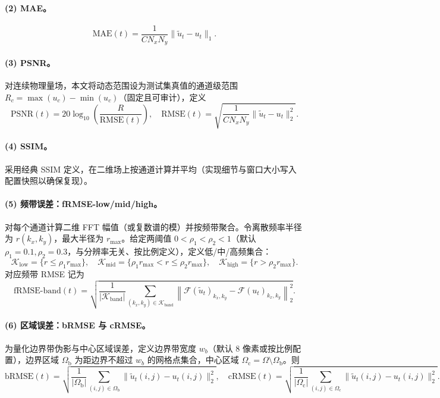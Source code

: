 \paragraph{(2) MAE。}
\begin{equation}
\mathrm{MAE}(t) = \frac{1}{C N_x N_y}\|\tilde u_t-u_t\|_1.
\label{eq:mae}
\end{equation}

\paragraph{(3) PSNR。}
对连续物理量场，本文将动态范围设为测试集真值的通道级范围 $R_c=\max(u_c)-\min(u_c)$（固定且可审计），定义
\begin{equation}
\mathrm{PSNR}(t)=20\log_{10}\left(\frac{R}{\mathrm{RMSE}(t)}\right),
\quad
\mathrm{RMSE}(t)=\sqrt{\frac{1}{C N_x N_y}\|\tilde u_t-u_t\|_2^2}.
\label{eq:psnr}
\end{equation}

\paragraph{(4) SSIM。}
采用经典 SSIM 定义\cite{wang2004ssim}，在二维场上按通道计算并平均（实现细节与窗口大小写入配置快照以确保复现）。

\paragraph{(5) 频带误差：fRMSE-low/mid/high。}
对每个通道计算二维 FFT 幅值（或复数谱的模）并按频带聚合。令离散频率半径为 $r(k_x,k_y)$，最大半径为 $r_{\max}$。给定两阈值 $0<\rho_1<\rho_2<1$（默认 $\rho_1=0.1,\rho_2=0.3$，与分辨率无关、按比例定义），定义低/中/高频集合：
\[
\mathcal{K}_{\text{low}}=\{r\le \rho_1 r_{\max}\},\quad
\mathcal{K}_{\text{mid}}=\{\rho_1 r_{\max}< r\le \rho_2 r_{\max}\},\quad
\mathcal{K}_{\text{high}}=\{r> \rho_2 r_{\max}\}.
\]
对应频带 RMSE 记为
\begin{equation}
\mathrm{fRMSE\mbox{-}band}(t)=
\sqrt{
\frac{1}{|\mathcal{K}_{\text{band}}|}
\sum_{(k_x,k_y)\in\mathcal{K}_{\text{band}}}
\left\|
\mathcal{F}(\tilde u_t)_{k_x,k_y}-\mathcal{F}(u_t)_{k_x,k_y}
\right\|_2^2
}.
\label{eq:frmse}
\end{equation}

\paragraph{(6) 区域误差：bRMSE 与 cRMSE。}
为量化边界带伪影与中心区域误差，定义边界带宽度 $w_b$（默认 8 像素或按比例配置），边界区域 $\Omega_{\text{b}}$ 为距边界不超过 $w_b$ 的网格点集合，中心区域 $\Omega_{\text{c}}=\Omega\setminus\Omega_{\text{b}}$。则
\begin{equation}
\mathrm{bRMSE}(t)=\sqrt{\frac{1}{|\Omega_{\text{b}}|}\sum_{(i,j)\in\Omega_{\text{b}}}\|\tilde u_t(i,j)-u_t(i,j)\|_2^2},
\quad
\mathrm{cRMSE}(t)=\sqrt{\frac{1}{|\Omega_{\text{c}}|}\sum_{(i,j)\in\Omega_{\text{c}}}\|\tilde u_t(i,j)-u_t(i,j)\|_2^2}.
\label{eq:brmse_crmse}
\end{equation}

